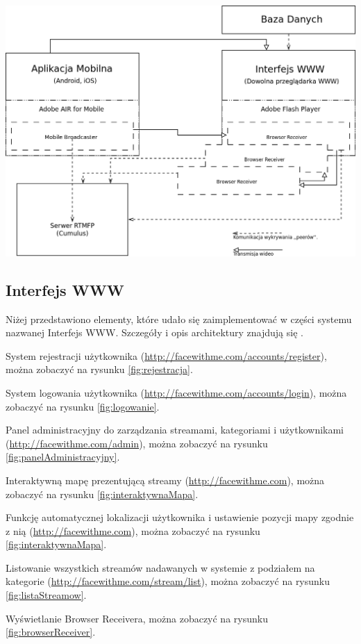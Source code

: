 \begin{center}
    \includegraphics[width=\textwidth]{diagramy/architetura-implementacja.png}
    \label{fig:rejestracja}
\end{center}

\subsection{Interfejs WWW}
Niżej przedstawiono elementy, które udało się zaimplementować w części systemu nazwanej Interfejs WWW. Szczegóły i opis architektury znajdują się .

\begin{packed_item}
    \item{System rejestracji użytkownika (\url{http://facewithme.com/accounts/register}), można zobaczyć na rysunku \ref{fig:rejestracja}.}
    \item{System logowania użytkownika (\url{http://facewithme.com/accounts/login}), można zobaczyć na rysunku \ref{fig:logowanie}.}
    \item{Panel administracyjny do zarządzania streamami, kategoriami i użytkownikami (\url{http://facewithme.com/admin}), można zobaczyć na rysunku \ref{fig:panelAdministracyjny}.}
    \item{Interaktywną mapę prezentującą streamy (\url{http://facewithme.com}), można zobaczyć na rysunku \ref{fig:interaktywnaMapa}.}
    \item{Funkcję automatycznej lokalizacji użytkownika i ustawienie pozycji mapy zgodnie z nią (\url{http://facewithme.com}), można zobaczyć na rysunku \ref{fig:interaktywnaMapa}.}
    \item{Listowanie wszystkich streamów nadawanych w systemie z podziałem na kategorie (\url{http://facewithme.com/stream/list}), można zobaczyć na rysunku \ref{fig:listaStreamow}.}
    \item{Wyświetlanie Browser Receivera, można zobaczyć na rysunku \ref{fig:browserReceiver}.}
\end{packed_item}

